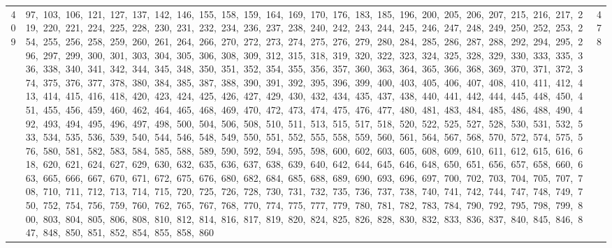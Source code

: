 \begin{longtable}{c|p{}|r}
409 & 97,\ 103,\ 106,\ 121,\ 127,\ 137,\ 142,\ 146,\ 155,\ 158,\ 159,\ 164,\ 169,\ 170,\ 176,\ 183,\ 185,\ 196,\ 200,\ 205,\ 206,\ 207,\ 215,\ 216,\ 217,\ 219,\ 220,\ 221,\ 224,\ 225,\ 228,\ 230,\ 231,\ 232,\ 234,\ 236,\ 237,\ 238,\ 240,\ 242,\ 243,\ 244,\ 245,\ 246,\ 247,\ 248,\ 249,\ 250,\ 252,\ 253,\ 254,\ 255,\ 256,\ 258,\ 259,\ 260,\ 261,\ 264,\ 266,\ 270,\ 272,\ 273,\ 274,\ 275,\ 276,\ 279,\ 280,\ 284,\ 285,\ 286,\ 287,\ 288,\ 292,\ 294,\ 295,\ 296,\ 297,\ 299,\ 300,\ 301,\ 303,\ 304,\ 305,\ 306,\ 308,\ 309,\ 312,\ 315,\ 318,\ 319,\ 320,\ 322,\ 323,\ 324,\ 325,\ 328,\ 329,\ 330,\ 333,\ 335,\ 336,\ 338,\ 340,\ 341,\ 342,\ 344,\ 345,\ 348,\ 350,\ 351,\ 352,\ 354,\ 355,\ 356,\ 357,\ 360,\ 363,\ 364,\ 365,\ 366,\ 368,\ 369,\ 370,\ 371,\ 372,\ 374,\ 375,\ 376,\ 377,\ 378,\ 380,\ 384,\ 385,\ 387,\ 388,\ 390,\ 391,\ 392,\ 395,\ 396,\ 399,\ 400,\ 403,\ 405,\ 406,\ 407,\ 408,\ 410,\ 411,\ 412,\ 413,\ 414,\ 415,\ 416,\ 418,\ 420,\ 423,\ 424,\ 425,\ 426,\ 427,\ 429,\ 430,\ 432,\ 434,\ 435,\ 437,\ 438,\ 440,\ 441,\ 442,\ 444,\ 445,\ 448,\ 450,\ 451,\ 455,\ 456,\ 459,\ 460,\ 462,\ 464,\ 465,\ 468,\ 469,\ 470,\ 472,\ 473,\ 474,\ 475,\ 476,\ 477,\ 480,\ 481,\ 483,\ 484,\ 485,\ 486,\ 488,\ 490,\ 492,\ 493,\ 494,\ 495,\ 496,\ 497,\ 498,\ 500,\ 504,\ 506,\ 508,\ 510,\ 511,\ 513,\ 515,\ 517,\ 518,\ 520,\ 522,\ 525,\ 527,\ 528,\ 530,\ 531,\ 532,\ 533,\ 534,\ 535,\ 536,\ 539,\ 540,\ 544,\ 546,\ 548,\ 549,\ 550,\ 551,\ 552,\ 555,\ 558,\ 559,\ 560,\ 561,\ 564,\ 567,\ 568,\ 570,\ 572,\ 574,\ 575,\ 576,\ 580,\ 581,\ 582,\ 583,\ 584,\ 585,\ 588,\ 589,\ 590,\ 592,\ 594,\ 595,\ 598,\ 600,\ 602,\ 603,\ 605,\ 608,\ 609,\ 610,\ 611,\ 612,\ 615,\ 616,\ 618,\ 620,\ 621,\ 624,\ 627,\ 629,\ 630,\ 632,\ 635,\ 636,\ 637,\ 638,\ 639,\ 640,\ 642,\ 644,\ 645,\ 646,\ 648,\ 650,\ 651,\ 656,\ 657,\ 658,\ 660,\ 663,\ 665,\ 666,\ 667,\ 670,\ 671,\ 672,\ 675,\ 676,\ 680,\ 682,\ 684,\ 685,\ 688,\ 689,\ 690,\ 693,\ 696,\ 697,\ 700,\ 702,\ 703,\ 704,\ 705,\ 707,\ 708,\ 710,\ 711,\ 712,\ 713,\ 714,\ 715,\ 720,\ 725,\ 726,\ 728,\ 730,\ 731,\ 732,\ 735,\ 736,\ 737,\ 738,\ 740,\ 741,\ 742,\ 744,\ 747,\ 748,\ 749,\ 750,\ 752,\ 754,\ 756,\ 759,\ 760,\ 762,\ 765,\ 767,\ 768,\ 770,\ 774,\ 775,\ 777,\ 779,\ 780,\ 781,\ 782,\ 783,\ 784,\ 790,\ 792,\ 795,\ 798,\ 799,\ 800,\ 803,\ 804,\ 805,\ 806,\ 808,\ 810,\ 812,\ 814,\ 816,\ 817,\ 819,\ 820,\ 824,\ 825,\ 826,\ 828,\ 830,\ 832,\ 833,\ 836,\ 837,\ 840,\ 845,\ 846,\ 847,\ 848,\ 850,\ 851,\ 852,\ 854,\ 855,\ 858,\ 860 & 478 \\

\end{longtable}
